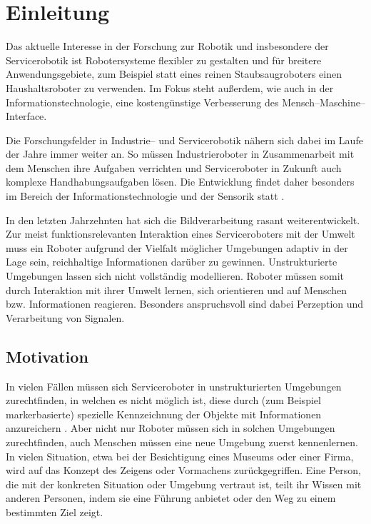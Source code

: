 
\chapter{Einleitung}
\label{einleitung_cha}
\authorsection{\editorabel}

Das aktuelle Interesse in der Forschung zur Robotik und insbesondere der Servicerobotik ist Robotersysteme flexibler zu gestalten und für breitere Anwendungsgebiete, zum Beispiel statt eines reinen Staubsaugroboters einen Haushaltsroboter zu verwenden.
Im Fokus steht außerdem, wie auch in der Informationstechnologie, eine kostengünstige Verbesserung des Mensch--Maschine--Interface\cite{kinect_1}.

Die Forschungsfelder in Industrie-- und Servicerobotik nähern sich dabei im Laufe der Jahre immer weiter an.
So müssen Industrieroboter in Zusammenarbeit mit dem Menschen ihre Aufgaben verrichten und Serviceroboter in Zukunft auch komplexe Handhabungsaufgaben lösen.
Die Entwicklung findet daher besonders im Bereich der Informationstechnologie und der Sensorik statt  \cite{kinect_2}.

In den letzten Jahrzehnten hat sich die Bildverarbeitung rasant weiterentwickelt.
Zur meist funktionsrelevanten Interaktion eines Serviceroboters mit der Umwelt muss ein Roboter aufgrund der Vielfalt möglicher Umgebungen adaptiv in der Lage sein, reichhaltige Informationen darüber zu gewinnen.
Unstrukturierte Umgebungen lassen sich nicht vollständig modellieren.
Roboter müssen somit durch Interaktion mit ihrer Umwelt lernen, sich orientieren und auf Menschen bzw. Informationen reagieren.
Besonders anspruchsvoll sind dabei Perzeption und Verarbeitung von Signalen.




\section{Motivation}
\label{motivation_real_sec}
\authorsection{\editorjulian, \editortobias}


In vielen Fällen müssen sich Serviceroboter in unstrukturierten Umgebungen zurechtfinden, in welchen es nicht möglich ist, diese durch (zum Beispiel markerbasierte) spezielle Kennzeichnung der Objekte mit Informationen anzureichern \citep{sturm10rss-workshop}.
Aber nicht nur Roboter müssen sich in solchen Umgebungen zurechtfinden, auch Menschen müssen eine neue Umgebung zuerst kennenlernen.
In vielen Situation, etwa bei der Besichtigung eines Museums oder einer Firma, wird auf das Konzept des Zeigens oder Vormachens zurückgegriffen.
Eine Person, die mit der konkreten Situation oder Umgebung vertraut ist, teilt ihr Wissen mit anderen Personen, indem sie eine Führung anbietet oder den Weg zu einem bestimmten Ziel zeigt.

